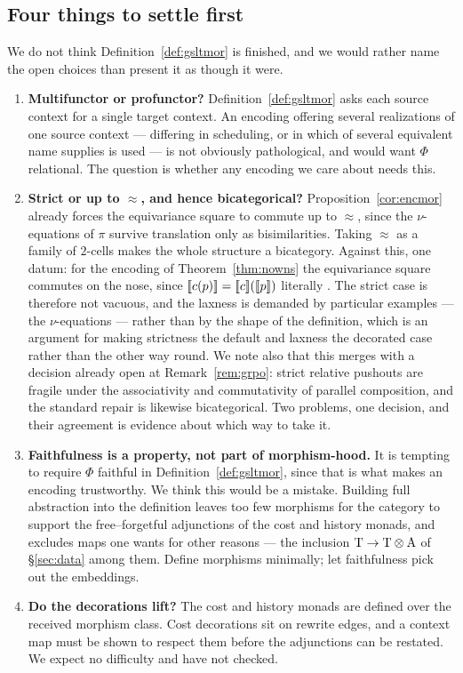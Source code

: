 \documentclass{article}
\begin{document}
\subsection{Four things to settle first}

We do not think Definition~\ref{def:gsltmor} is finished, and we would rather name the open choices than present it as though it were.

\begin{enumerate}
    \item \textbf{Multifunctor or profunctor?} Definition~\ref{def:gsltmor} asks each source context for a single target context. An encoding offering several realizations of one source context --- differing in scheduling, or in which of several equivalent name supplies is used --- is not obviously pathological, and would want $\Phi$ relational. The question is whether any encoding we care about needs this.

    \item \textbf{Strict or up to $\approx$, and hence bicategorical?} Proposition~\ref{cor:encmor} already forces the equivariance square to commute up to $\approx$, since the $\nu$-equations of $\pi$ survive translation only as bisimilarities. Taking $\approx$ as a family of $2$-cells makes the whole structure a bicategory. Against this, one datum: for the encoding of Theorem~\ref{thm:nowns} the equivariance square commutes on the nose, since $[\![c(p)]\!]=[\![c]\!]([\![p]\!])$ literally \citep{nowns}. The strict case is therefore not vacuous, and the laxness is demanded by particular examples --- the $\nu$-equations --- rather than by the shape of the definition, which is an argument for making strictness the default and laxness the decorated case rather than the other way round. We note also that this merges with a decision already open at Remark~\ref{rem:grpo}: strict relative pushouts are fragile under the associativity and commutativity of parallel composition, and the standard repair \citep{grpo,grpo2} is likewise bicategorical. Two problems, one decision, and their agreement is evidence about which way to take it.

    \item \textbf{Faithfulness is a property, not part of morphism-hood.} It is tempting to require $\Phi$ faithful in Definition~\ref{def:gsltmor}, since that is what makes an encoding trustworthy. We think this would be a mistake. Building full abstraction into the definition leaves too few morphisms for the category to support the free--forgetful adjunctions of the cost and history monads, and excludes maps one wants for other reasons --- the inclusion $\mathrm{T}\to\mathrm{T}\otimes\mathrm{A}$ of \S\ref{sec:data} among them. Define morphisms minimally; let faithfulness pick out the embeddings.

    \item \textbf{Do the decorations lift?} The cost and history monads are defined over the received morphism class. Cost decorations sit on rewrite edges, and a context map must be shown to respect them before the adjunctions can be restated. We expect no difficulty and have not checked.
\end{enumerate}
\end{document}
